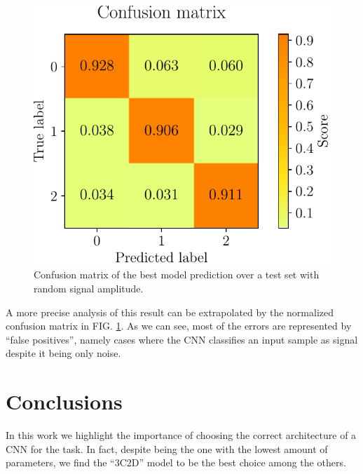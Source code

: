 \documentclass[prl,twocolumn]{revtex4-1}
\newcommand{\figref}[1]{FIG. \ref{#1}}
\begin{document}
\begin{figure}[!ht]
    \centering
    \includegraphics[width=0.64\columnwidth]{Images/Results/3C2D_confusion_matrix.pdf}
    \caption{Confusion matrix of the best model prediction over a test set with random signal amplitude.}
    \label{fig:confmat}
\end{figure}

A more precise analysis of this result can be extrapolated by the normalized confusion matrix in \figref{fig:confmat}. As we can see, most of the errors are represented by ``false positives'', namely cases where the CNN classifies an input sample as signal despite it being only noise.






%





\section{Conclusions}

In this work we highlight the importance of choosing the correct architecture of a CNN for the task. In fact, despite being the one with the lowest amount of parameters, we find the ``$3$C$2$D'' model to be the best choice among the others. 
\end{document}

